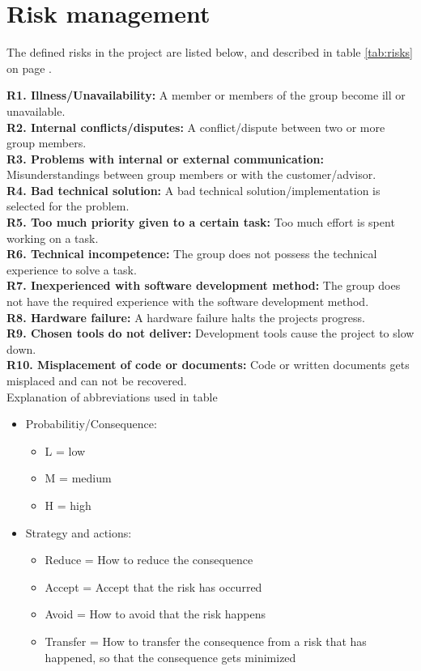 

\section{Risk management}

The defined risks in the project are listed below, and described in table \ref{tab:risks} on page \pageref{tab:risks}.
\newline

\textbf{R1. Illness/Unavailability:} A member or members of the group become ill or unavailable. \\
\textbf{R2. Internal conflicts/disputes:} A conflict/dispute between two or more group members. \\
\textbf{R3. Problems with internal or external communication:} Misunderstandings between group members or with the customer/advisor. \\
\textbf{R4. Bad technical solution:} A bad technical solution/implementation is selected for the problem. \\
\textbf{R5. Too much priority given to a certain task:} Too much effort is spent working on a task. \\
\textbf{R6. Technical incompetence:} The group does not possess the technical experience to solve a task. \\
\textbf{R7. Inexperienced with software development method:} The group does not have the required experience with the software development method. \\
\textbf{R8. Hardware failure:} A hardware failure halts the projects progress. \\
\textbf{R9. Chosen tools do not deliver:} Development tools cause the project to slow down. \\
\textbf{R10. Misplacement of code or documents:} Code or written documents gets misplaced and can not be recovered. \\

Explanation of abbreviations used in table%
\begin{itemize}
\item{}Probabilitiy/Consequence:
\begin{itemize}
\item{}L = low
\item{}M = medium
\item{}H = high
\end{itemize}
\item{}Strategy and actions:
\begin{itemize}
\item{}Reduce = How to reduce the consequence
\item{}Accept = Accept that the risk has occurred
\item{}Avoid = How to avoid that the risk happens
\item{}Transfer = How to transfer the consequence from a risk that has happened, so that the consequence gets minimized
\end{itemize}
\end{itemize}








